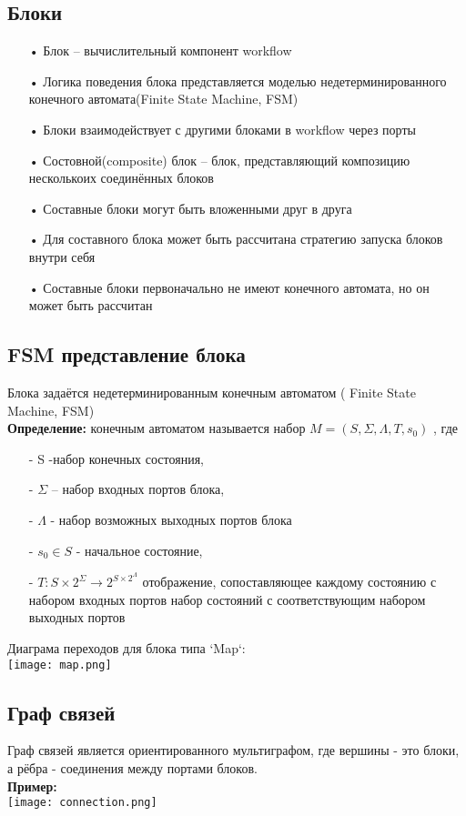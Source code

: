 \documentclass[a4paper,14pt]{article}
\begin{document}
\subsection{Блоки}
\begin{enumerate}
\item[•] Блок – вычислительный компонент workflow 
\item[•] Логика поведения блока представляется моделью недетерминированного конечного автомата(Finite State Machine, FSM)
\item[•] Блоки взаимодействует с другими блоками в workflow через порты
\item[•] Состовной(composite) блок – блок, представляющий композицию несколькоих соединённых блоков
\item[•] Составные блоки могут быть вложенными друг в друга
\item[•] Для составного блока может быть рассчитана стратегию запуска блоков внутри себя 
\item[•] Составные блоки первоначально не имеют конечного автомата, но он может быть рассчитан
\end{enumerate}

\newpage
\subsection{FSM представление блока}
Блока задаётся недетерминированным конечным автоматом ( Finite State Machine, FSM)\\
\textbf{Определение:} конечным автоматом называется набор $ M = (S, \Sigma,\Lambda, T, s_{0})$ , где
\begin{enumerate}
\item[-] S -набор конечных состояния,
\item[-] $\Sigma$ – набор входных портов блока,
\item[-] $\Lambda$ - набор возможных выходных портов блока
\item[-] $s_{0} \in S$ - начальное состояние,
\item[-] $T: S \times 2^{\Sigma} \rightarrow  2^{S \times 2^{\Lambda}}$ отображение, сопоставляющее каждому состоянию с набором входных портов набор состояний с соответствующим набором выходных портов
\end{enumerate}
Диаграма переходов для блока типа `Map`:
\\
\texttt{[image: map.png]}


\newpage
\subsection{Граф связей}
Граф связей является ориентированного мультиграфом, где вершины - это блоки, а рёбра - соединения между портами блоков.\\
\textbf{Пример:}\\
\texttt{[image: connection.png]}
\end{document}
